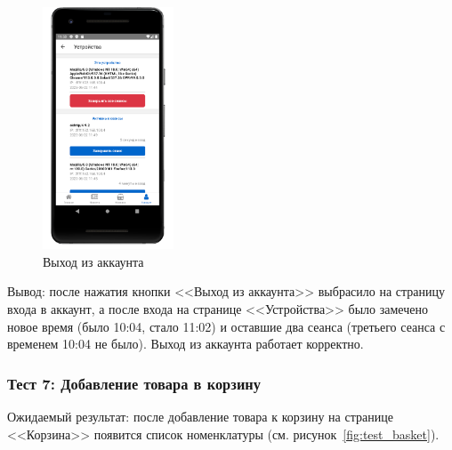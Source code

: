\begin{figure}[!htb]
\begin{minipage}{0.19\textwidth}
        \includegraphics[height=7.2cm]
        {images/mobile/logout/sessions_after.png}
    \end{minipage}

    \caption{Выход из аккаунта}
    \label{fig:test_logout}
\end{figure}

Вывод:
после нажатия кнопки <<Выход из аккаунта>> выбрасило на страницу входа в аккаунт, а после входа
на странице <<Устройства>> было замечено новое время (было 10:04, стало 11:02) и оставшие два сеанса
(третьего сеанса с временем 10:04 не было). Выход из аккаунта работает корректно.

\subsubsection*{Тест 7: Добавление товара в корзину}

Ожидаемый результат: после добавление товара к корзину на странице <<Корзина>> появится список номенклатуры (см. рисунок~\ref{fig:test_basket}).

